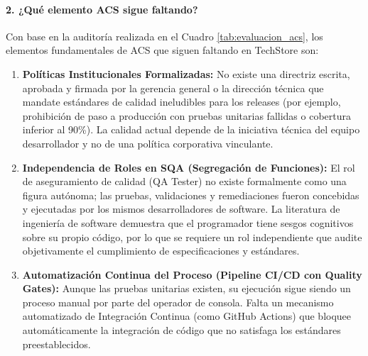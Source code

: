 \documentclass{article}
\begin{document}
\paragraph{2. ¿Qué elemento ACS sigue faltando?}
Con base en la auditoría realizada en el Cuadro \ref{tab:evaluacion_acs}, los elementos fundamentales de ACS que siguen faltando en TechStore son:
\begin{enumerate}
    \item \textbf{Políticas Institucionales Formalizadas:} No existe una directriz escrita, aprobada y firmada por la gerencia general o la dirección técnica que mandate estándares de calidad ineludibles para los releases (por ejemplo, prohibición de paso a producción con pruebas unitarias fallidas o cobertura inferior al 90\%). La calidad actual depende de la iniciativa técnica del equipo desarrollador y no de una política corporativa vinculante.
    \item \textbf{Independencia de Roles en SQA (Segregación de Funciones):} El rol de aseguramiento de calidad (QA Tester) no existe formalmente como una figura autónoma; las pruebas, validaciones y remediaciones fueron concebidas y ejecutadas por los mismos desarrolladores de software. La literatura de ingeniería de software \cite{myers2011, pressman2014} demuestra que el programador tiene sesgos cognitivos sobre su propio código, por lo que se requiere un rol independiente que audite objetivamente el cumplimiento de especificaciones y estándares.
    \item \textbf{Automatización Continua del Proceso (Pipeline CI/CD con Quality Gates):} Aunque las pruebas unitarias existen, su ejecución sigue siendo un proceso manual por parte del operador de consola. Falta un mecanismo automatizado de Integración Continua (como GitHub Actions) que bloquee automáticamente la integración de código que no satisfaga los estándares preestablecidos.
\end{enumerate}
\end{document}
